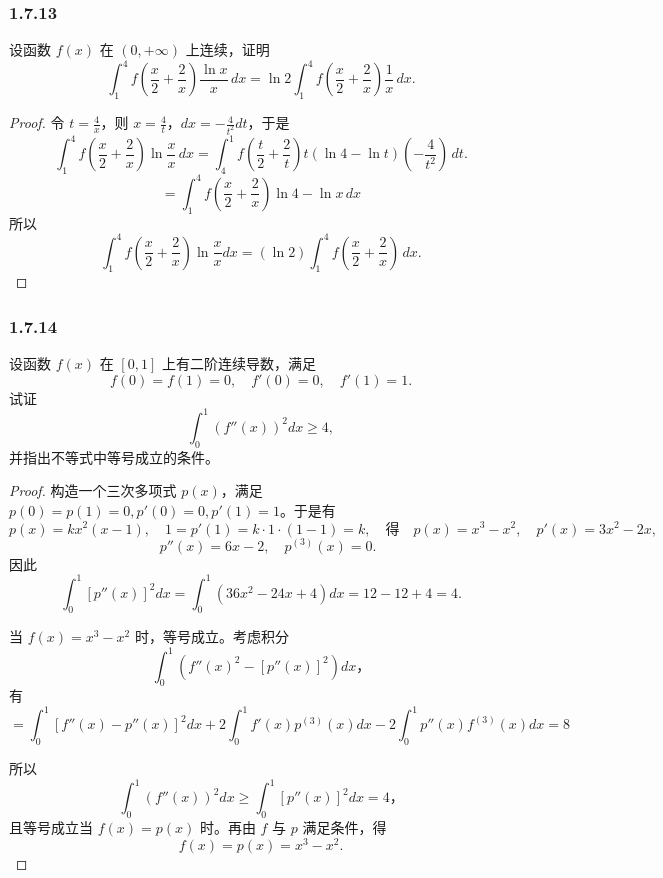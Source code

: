 \documentclass[12pt]{ctexart}
\begin{document}
\subsubsection*{1.7.13}

设函数 $f(x)$ 在 $(0,+\infty)$ 上连续，证明
\[
\int_1^4 f\left( \frac{x}{2} + \frac{2}{x} \right) \frac{\ln x}{x} \, dx = \ln 2 \int_1^4 f\left( \frac{x}{2} + \frac{2}{x} \right) \frac{1}{x} \, dx.
\]

\begin{proof}
    令 $t = \frac{4}{x}$，则 $x = \frac{4}{t}$，$dx = -\frac{4}{t^2} dt$，于是
    \[
    \int_1^4 f\left( \frac{x}{2} + \frac{2}{x} \right) \ln \frac{x}{x} \, dx = \int_4^1 f\left( \frac{t}{2} + \frac{2}{t} \right) t \left( \ln 4 - \ln t \right) \left( -\frac{4}{t^2} \right) \, dt.
    \]
    \[
    = \int_1^4 f\left( \frac{x}{2} + \frac{2}{x} \right) \ln 4 - \ln x \, dx
    \]
    所以
    \[
    \int_1^4 f\left( \frac{x}{2} + \frac{2}{x} \right) \ln \frac{x}{x} dx = (\ln 2) \int_1^4 f\left( \frac{x}{2} + \frac{2}{x} \right) \, dx.
    \]
\end{proof}

\subsubsection*{1.7.14}

设函数 $f(x)$ 在 $[0,1]$ 上有二阶连续导数，满足
\[
f(0) = f(1) = 0, \quad f'(0) = 0, \quad f'(1) = 1.
\]
试证
\[
\int_0^1 \left( f''(x) \right)^2 dx \geq 4,
\]
并指出不等式中等号成立的条件。

\begin{proof}
    构造一个三次多项式 $p(x)$，满足 $p(0) = p(1) = 0, p'(0) = 0, p'(1) = 1$。于是有
    \[
    p(x) = kx^2(x-1), \quad 1 = p'(1) = k \cdot 1 \cdot (1-1) = k, \quad \text{得} \quad p(x) = x^3 - x^2, \quad p'(x) = 3x^2 - 2x, 
    \]
    \[
    \quad p''(x) = 6x - 2, \quad p^{(3)}(x) = 0.
    \]
    因此
    \[
    \int_0^1 [p''(x)]^2 dx = \int_0^1 (36x^2 - 24x + 4) dx = 12 - 12 + 4 = 4.
    \]

    当 $f(x) = x^3 - x^2$ 时，等号成立。考虑积分
    \[
    \int_0^1 \left( f''(x)^2 - [p''(x)]^2 \right) dx，
    \]
    有
    \[
    = \int_0^1 [f''(x) - p''(x)]^2 dx + 2 \int_0^1 f'(x) p^{(3)}(x) dx - 2 \int_0^1 p''(x) f^{(3)}(x) dx = 8
    \]

    所以
    \[
    \int_0^1 \left( f''(x) \right)^2 dx \geq \int_0^1 \left[ p''(x) \right]^2 dx = 4，
    \]
    且等号成立当 $f(x) = p(x)$ 时。再由 $f$ 与 $p$ 满足条件，得
    \[
    f(x) = p(x) = x^3 - x^2.
    \]
\end{proof}
\end{document}
